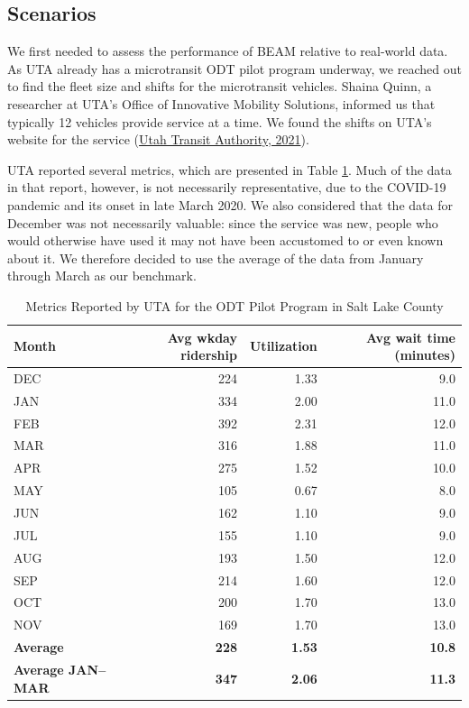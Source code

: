 \documentclass[
]{article}
\begin{document}
\hypertarget{scenario-configuration}{%
\subsection{Scenarios}\label{scenario-configuration}}

We first needed to assess the performance of BEAM relative to real-world data. As UTA already has a microtransit ODT pilot program underway, we reached out to find the fleet size and shifts for the microtransit vehicles. Shaina Quinn, a researcher at UTA's Office of Innovative Mobility Solutions, informed us that typically 12 vehicles provide service at a time. We found the shifts on UTA's website for the service (\protect\hyperlink{ref-SLCSouth}{Utah Transit Authority, 2021}).

UTA reported several metrics, which are presented in Table \ref{tab:uta-metrics}. Much of the data in that report, however, is not necessarily representative, due to the COVID-19 pandemic and its onset in late March 2020. We also considered that the data for December was not necessarily valuable: since the service was new, people who would otherwise have used it may not have been accustomed to or even known about it. We therefore decided to use the average of the data from January through March as our benchmark.

\begin{table}

\caption{\label{tab:uta-metrics}Metrics Reported by UTA for the ODT Pilot Program in Salt Lake County}
\centering
\begin{tabular}[t]{lrrr}
\toprule
Month & Avg wkday ridership & Utilization & Avg wait time (minutes)\\
\midrule
DEC & 224 & 1.33 & 9.0\\
JAN & 334 & 2.00 & 11.0\\
FEB & 392 & 2.31 & 12.0\\
MAR & 316 & 1.88 & 11.0\\
APR & 275 & 1.52 & 10.0\\
\addlinespace
MAY & 105 & 0.67 & 8.0\\
JUN & 162 & 1.10 & 9.0\\
JUL & 155 & 1.10 & 9.0\\
AUG & 193 & 1.50 & 12.0\\
SEP & 214 & 1.60 & 12.0\\
\addlinespace
OCT & 200 & 1.70 & 13.0\\
NOV & 169 & 1.70 & 13.0\\
\textbf{Average} & \textbf{228} & \textbf{1.53} & \textbf{10.8}\\
\textbf{Average JAN--MAR} & \textbf{347} & \textbf{2.06} & \textbf{11.3}\\
\bottomrule
\end{tabular}
\end{table}
\end{document}
